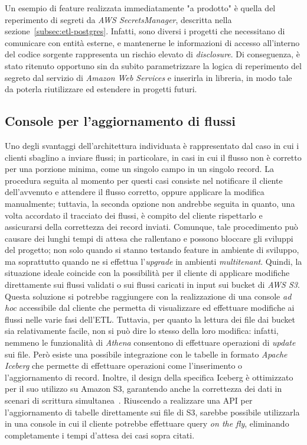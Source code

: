 Un esempio di feature realizzata immediatamente "a prodotto" è quella del reperimento di segreti da \textit{AWS SecretsManager}, descritta nella sezione~\ref{subsec:etl-postgres}.
Infatti, sono diversi i progetti che necessitano di comunicare con entità esterne, e mantenerne le informazioni di accesso all'interno del codice sorgente rappresenta un rischio elevato di \textit{disclosure}.
Di conseguenza, è stato ritenuto opportuno sin da subito parametrizzare la logica di reperimento del segreto dal servizio di \textit{Amazon Web Services} e inserirla in libreria, in modo tale da poterla riutilizzare ed estendere in progetti futuri.

\subsection{Console per l'aggiornamento di flussi}\label{subsec:future-console}
Uno degli svantaggi dell'architettura individuata è rappresentato dal caso in cui i clienti sbaglino a inviare flussi;
in particolare, in casi in cui il flusso non è corretto per una porzione minima, come un singolo campo in un singolo record.
La procedura seguita al momento per questi casi consiste nel notificare il cliente dell'avvenuto e attendere il flusso corretto, oppure applicare la modifica manualmente;
tuttavia, la seconda opzione non andrebbe seguita in quanto, una volta accordato il tracciato dei flussi, è compito del cliente rispettarlo e assicurarsi della correttezza dei record inviati.
Comunque, tale procedimento può causare dei lunghi tempi di attesa che rallentano e possono bloccare gli sviluppi del progetto;
non solo quando si stanno testando feature in ambiente di sviluppo, ma soprattutto quando ne si effettua l'\textit{upgrade} in ambienti \textit{multitenant}.
Quindi, la situazione ideale coincide con la possibilità per il cliente di applicare modifiche direttamente sui flussi validati o sui flussi caricati in input sui bucket di \textit{AWS S3}.
Questa soluzione si potrebbe raggiungere con la realizzazione di una console \textit{ad hoc} accessibile dal cliente che permetta di visualizzare ed effettuare modifiche ai flussi nelle varie fasi dell'ETL.
Tuttavia, per quanto la lettura dei file dai bucket sia relativamente facile, non si può dire lo stesso della loro modifica:
infatti, nemmeno le funzionalità di \textit{Athena} consentono di effettuare operazioni di \textit{update} sui file.
Però esiste una possibile integrazione con le tabelle in formato \textit{Apache Iceberg} che permette di effettuare operazioni come l'inserimento o l'aggiornamento di record.
Inoltre, il design della specifica Iceberg è ottimizzato per il suo utilizzo su Amazon S3, garantendo anche la correttezza dei dati in scenari di scrittura simultanea~\cite{apache-iceberg}.
Riuscendo a realizzare una API per l'aggiornamento di tabelle direttamente sui file di S3, sarebbe possibile utilizzarla in una console in cui il cliente potrebbe effettuare query \textit{on the fly}, eliminando completamente i tempi d'attesa dei casi sopra citati.
